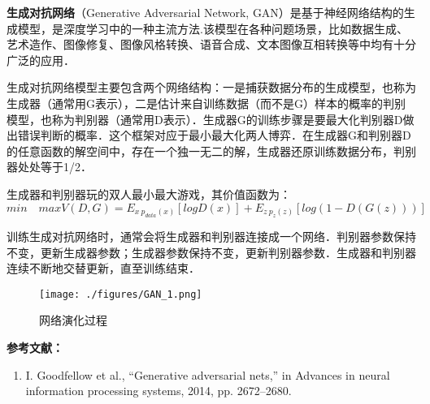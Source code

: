 
\textbf{生成对抗网络}（Generative Adversarial Network, GAN）是基于神经网络结构的生成模型，是深度学习中的一种主流方法.该模型在各种问题场景，比如数据生成、艺术造作、图像修复、图像风格转换、语音合成、文本图像互相转换等中均有十分广泛的应用．

生成对抗网络模型主要包含两个网络结构：一是捕获数据分布的生成模型，也称为生成器（通常用G表示），二是估计来自训练数据（而不是G）样本的概率的判别模型，也称为判别器（通常用D表示）．生成器G的训练步骤是要最大化判别器D做出错误判断的概率．这个框架对应于最小最大化两人博弈．在生成器G和判别器D的任意函数的解空间中，存在一个独一无二的解，生成器还原训练数据分布，判别器处处等于1/2．

生成器和判别器玩的双人最小最大游戏，其价值函数为：
\begin{equation}
min \quad maxV(D,G)=E_{x ~ p_{data}(x)}[logD(x)]+E_{z~p_z(z)}[log(1-D(G(z)))]
\end{equation}

训练生成对抗网络时，通常会将生成器和判别器连接成一个网络．判别器参数保持不变，更新生成器参数；生成器参数保持不变，更新判别器参数．生成器和判别器连续不断地交替更新，直至训练结束．
\begin{figure}[ht]
\centering
\texttt{[image: ./figures/GAN\_1.png]}
\caption{网络演化过程} \label{GAN_fig1}
\end{figure}





\textbf{参考文献：}
\begin{enumerate}
\item I. Goodfellow et al., “Generative adversarial nets,” in Advances in neural information processing systems, 2014, pp. 2672–2680.
\end{enumerate}